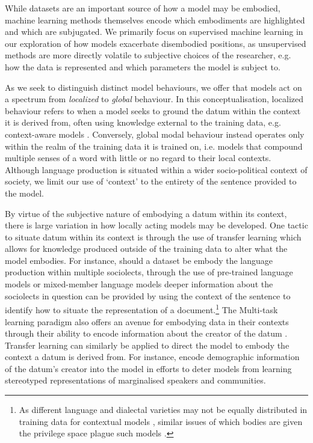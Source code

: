 While datasets are an important source of how a model may be embodied, machine learning methods themselves encode which embodiments are highlighted and which are subjugated. We primarily focus on supervised machine learning in our exploration of how models exacerbate disembodied positions, as unsupervised methods are more directly volatile to subjective choices of the researcher, e.g. how the data is represented and which parameters the model is subject to.

As we seek to distinguish distinct model behaviours, we offer that models act on a spectrum from \textit{localized} to \textit{global} behaviour. In this conceptualisation, localized behaviour refers to when a model seeks to ground the datum within the context it is derived from, often using knowledge external to the training data, e.g. context-aware models \cite{Garcia:2019,Devlin:2019}. Conversely, global modal behaviour instead operates only within the realm of the training data it is trained on, i.e. models that compound multiple senses of a word with little or no regard to their local contexts. Although language production is situated within a wider socio-political context of society, we limit our use of `context' to the entirety of the sentence provided to the model.

By virtue of the subjective nature of embodying a datum within its context, there is large variation in how locally acting models may be developed. One tactic to situate datum within its context is through the use of transfer learning which allows for knowledge produced outside of the training data to alter what the model embodies. For instance, should a dataset be embody the language production within multiple sociolects, through the use of pre-trained language models \cite{Devlin:2019} or mixed-member language models \cite{Blodgett:2016} deeper information about the sociolects in question can be provided by using the context of the sentence to identify how to situate the representation of a document.\footnote{As different language and dialectal varieties may not be equally distributed in training data for contextual models \cite{Dunn:2020}, similar issues of which bodies are given the privilege space plague such models \cite{Tan-Celis:2019}.} The Multi-task learning paradigm also offers an avenue for embodying data in their contexts through their ability to encode information about the creator of the datum \cite{Benton:2017,Garcia:2019}. Transfer learning can similarly be applied to direct the model to embody the context a datum is derived from. For instance, \citet{Romanov:2019} encode demographic information of the datum's creator into the model in efforts to deter models from learning stereotyped representations of marginalised speakers and communities.


